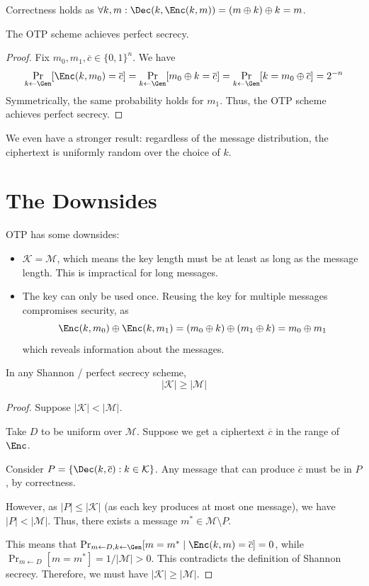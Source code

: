 Correctness holds as $\forall k, m: \Dec(k, \Enc(k, m)) = (m \oplus k) \oplus k = m$.

\begin{theorem}
	The OTP scheme achieves perfect secrecy.
\end{theorem}
\begin{proof}
	Fix $m_0, m_1, \overline{c} \in \{0,1\}^n$. We have
	\[
		\Pr_{k\gets \Gen}[\Enc(k,m_0) = \overline{c}] = \Pr_{k\gets \Gen}[m_0 \oplus k = \overline{c}] = \Pr_{k\gets \Gen}[k = m_0 \oplus \overline{c}] = 2^{-n}
	\]
	Symmetrically, the same probability holds for $m_1$. Thus, the OTP scheme achieves perfect secrecy.
\end{proof}

We even have a stronger result: regardless of the message distribution, the ciphertext is uniformly random over the choice of $k$.

\section{The Downsides}

OTP has some downsides:
\begin{itemize}
	\item $\mathcal K = \mathcal M$, which means the key length must be at least as long as the message length. This is impractical for long messages.
	\item The key can only be used once. Reusing the key for multiple messages compromises security, as
	      \[ \Enc(k, m_0) \oplus \Enc(k, m_1) = (m_0 \oplus k) \oplus (m_1 \oplus k) = m_0 \oplus m_1 \]
	      which reveals information about the messages.
\end{itemize}

\begin{theorem}
	In any Shannon / perfect secrecy scheme,
	\[
		|\mathcal K| \geq |\mathcal M|
	\]
\end{theorem}
\begin{proof}
	Suppose $|\mathcal K| < |\mathcal M|$.

	Take $D$ to be uniform over $\mathcal M$. Suppose we get a ciphertext $\overline{c}$ in the range of $\Enc$.

	Consider $P = \{\Dec(k,\overline{c}) : k \in \mathcal K\}$. Any message that can produce $\overline{c}$ must be in $P$, by correctness.

	However, as $|P| \leq |\mathcal K|$ (as each key produces at most one message), we have $|P| < |\mathcal M|$. Thus, there exists a message $m^* \in \mathcal M\setminus P$.

	This means that $\Pr_{m\gets D, k\gets \Gen}[m = m^* \mid \Enc(k,m) = \overline{c}] = 0$, while $\Pr_{m\gets D}[m = m^*] = 1/|\mathcal M| > 0$. This contradicts the definition of Shannon secrecy. Therefore, we must have $|\mathcal K| \geq |\mathcal M|$.
\end{proof}
